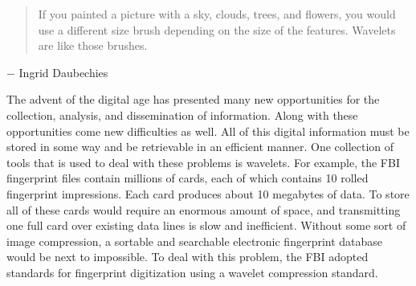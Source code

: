  \label{chap:bases}

\vspace*{-17 pt}

\vspace*{13 pt}

\label{sec:img_compress}

\begin{quote} If you painted a picture with a sky, clouds, trees, and flowers, you would use a different size brush depending on the size of the features. Wavelets are like those brushes.
\end{quote}
\vspace{-0.20in} 
\hspace{0.35in} $-$ Ingrid Daubechies

The advent of the digital age has presented many new opportunities for the collection, analysis,  and dissemination of information. Along with these opportunities come new difficulties as well. All of this digital information must be stored in some way and be retrievable in an efficient manner. One collection of tools that is used to deal with these problems is wavelets. For example, the FBI fingerprint files contain millions of cards, each of which contains 10 rolled fingerprint impressions. Each card produces about 10 megabytes of data. To store all of these cards would require an enormous amount of space, and transmitting one full card over existing data lines is slow and inefficient. Without some sort of image compression, a sortable and searchable electronic fingerprint database would be next to impossible. To deal with this problem, the FBI adopted standards for fingerprint digitization using a wavelet compression standard. 

